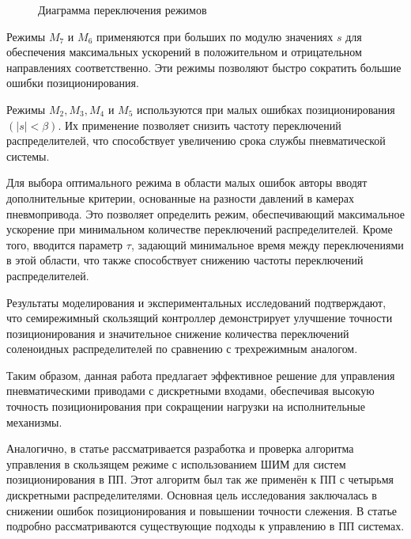 \begin{figure}[ht]
{
    }
    \caption{Диаграмма переключения режимов }\label{fig:actuators_scheme}
\end{figure}

Режимы $M_7$ и $M_6$ применяются при больших по модулю значениях $s$ для обеспечения максимальных ускорений в положительном и
отрицательном направлениях соответственно. Эти режимы позволяют быстро сократить большие ошибки позиционирования.

Режимы $M_2, M_3, M_4$ и $M_5$ используются при малых ошибках позиционирования $(\lvert s \rvert < \beta)$. Их применение позволяет снизить частоту
переключений распределителей, что способствует увеличению срока службы пневматической системы.

Для выбора оптимального режима в области малых ошибок авторы вводят дополнительные критерии, основанные на разности давлений
в камерах пневмопривода. Это позволяет определить режим, обеспечивающий максимальное ускорение при минимальном количестве
переключений
распределителей. Кроме того, вводится параметр $\tau$, задающий минимальное время между переключениями в этой области, что также
способствует снижению частоты переключений распределителей.

Результаты моделирования и экспериментальных исследований подтверждают,
что семирежимный скользящий контроллер демонстрирует улучшение точности позиционирования и значительное снижение количества переключений соленоидных
распределителей по сравнению с трехрежимным аналогом.

Таким образом, данная работа предлагает эффективное решение для управления пневматическими приводами с дискретными входами, обеспечивая
высокую точность позиционирования при сокращении нагрузки на исполнительные механизмы.


Аналогично, в статье \cite*{Zhonglin} рассматривается разработка и проверка алгоритма управления в скользящем режиме с
использованием ШИМ для систем позиционирования в ПП. Этот алгоритм был так же применён к ПП с четырьмя дискретными распределителями.
Основная цель исследования заключалась в снижении ошибок позиционирования и повышении точности слежения. В статье подробно рассматриваются существующие подходы к управлению в ПП системах.

